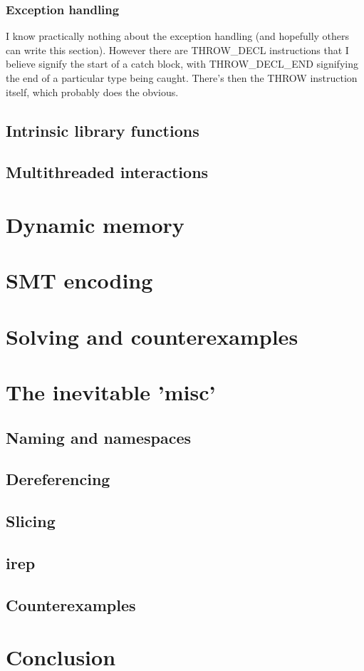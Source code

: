 \documentclass{article}
\begin{document}
\subsubsection{Exception handling}

I know practically nothing about the exception handling (and hopefully others
can write this section). However there are THROW\_DECL instructions that I
believe signify the start of a catch block, with THROW\_DECL\_END signifying
the end of a particular type being caught. There's then the THROW instruction
itself, which probably does the obvious.

\subsection{Intrinsic library functions}
\subsection{Multithreaded interactions}

\section{Dynamic memory}
\section{SMT encoding}
\section{Solving and counterexamples}
\section{The inevitable 'misc'}
\subsection{Naming and namespaces}
\subsection{Dereferencing}
\subsection{Slicing}
\subsection{irep}
\subsection{Counterexamples}
\section{Conclusion}
\end{document}
